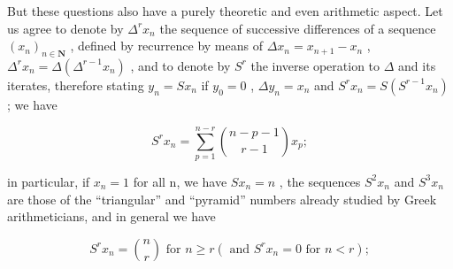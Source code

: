 But these questions also have a purely theoretic and even arithmetic aspect. Let us agree to denote by \(\Delta^r x_n\) the sequence of successive differences of a sequence \((x_n)_{n\in \mathbf{N}}\) , defined by recurrence by means of \(\Delta x_{n} = x_{n + 1} - x_{n}\) , \(\Delta^r x_n = \Delta (\Delta^{r - 1}x_n)\) , and to denote by \(S^r\) the inverse operation to \(\Delta\) and its iterates, therefore stating \(y_{n} = Sx_{n}\) if \(y_0 = 0\) , \(\Delta y_{n} = x_{n}\) and \(S^r x_n = S(S^{r - 1}x_n)\) ; we have

\[
S ^ {r} x _ {n} = \sum_ {p = 1} ^ {n - r} \binom{n - p - 1}{r - 1} x _ {p};
\]

in particular, if \(x_{n}=1\) for all n, we have \(Sx_{n}=n\) , the sequences \(S^{2}x_{n}\) and \(S^{3}x_{n}\) are those of the ``triangular'' and ``pyramid'' numbers already studied by Greek arithmeticians, and in general we have

\[
S ^ {r} x _ {n} = \binom{n}{r} \text { for } n \geq r (\text { and } S ^ {r} x _ {n} = 0 \text { for } n <   r);
\]


